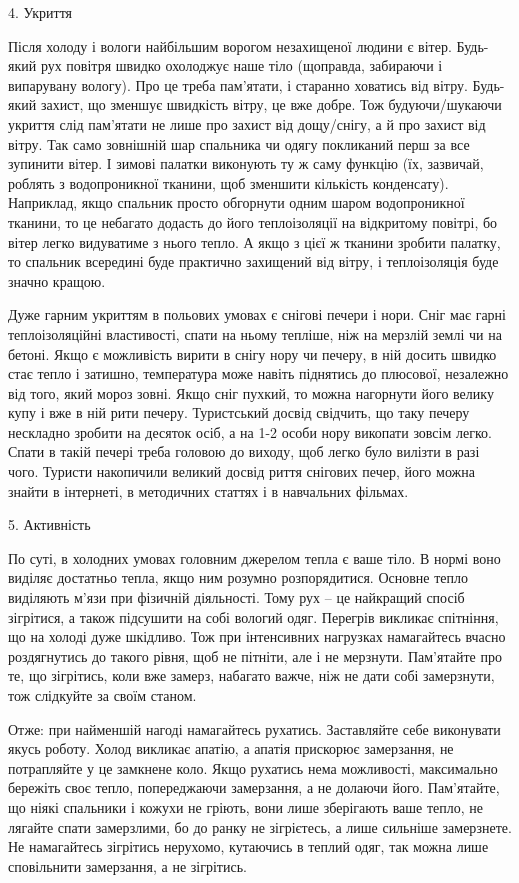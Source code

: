 4. Укриття

Після холоду і вологи найбільшим ворогом незахищеної людини є вітер. Будь-який
рух повітря швидко охолоджує наше тіло (щоправда, забираючи і випарувану
вологу). Про це треба пам’ятати, і старанно ховатись від вітру. Будь-який
захист, що зменшує швидкість вітру, це вже добре. Тож будуючи/шукаючи укриття
слід пам’ятати не лише про захист від дощу/снігу, а й про захист від вітру. Так
само зовнішній шар спальника чи одягу покликаний перш за все зупинити вітер. І
зимові палатки виконують ту ж саму функцію (їх, зазвичай, роблять з
водопроникної тканини, щоб зменшити кількість конденсату). Наприклад, якщо
спальник просто обгорнути одним шаром водопроникної тканини, то це небагато
додасть до його теплоізоляції на відкритому повітрі, бо вітер легко видуватиме
з нього тепло. А якщо з цієї ж тканини зробити палатку, то спальник всередині
буде практично захищений від вітру, і теплоізоляція буде значно кращою.

Дуже гарним укриттям в польових умовах є снігові печери і нори. Сніг має гарні
теплоізоляційні властивості, спати на ньому тепліше, ніж на мерзлій землі чи на
бетоні. Якщо є можливість вирити в снігу нору чи печеру, в ній досить швидко
стає тепло і затишно, температура може навіть піднятись до плюсової, незалежно
від того, який мороз зовні. Якщо сніг пухкий, то можна нагорнути його велику
купу і вже в ній рити печеру. Туристський досвід свідчить, що таку печеру
нескладно зробити на десяток осіб, а на 1-2 особи нору викопати зовсім легко.
Спати в такій печері треба головою до виходу, щоб легко було вилізти в разі
чого. Туристи накопичили великий досвід риття снігових печер, його можна знайти
в інтернеті, в методичних статтях і в навчальних фільмах.

5. Активність

По суті, в холодних умовах головним джерелом тепла є ваше тіло. В нормі воно
виділяє достатньо тепла, якщо ним розумно розпорядитися. Основне тепло
виділяють м’язи при фізичній діяльності. Тому рух – це найкращий спосіб
зігрітися, а також підсушити на собі вологий одяг. Перегрів викликає спітніння,
що на холоді дуже шкідливо. Тож при інтенсивних нагрузках намагайтесь вчасно
роздягнутись до такого рівня, щоб не пітніти, але і не мерзнути. Пам’ятайте про
те, що зігрітись, коли вже замерз, набагато важче, ніж не дати собі замерзнути,
тож слідкуйте за своїм станом.

Отже: при найменшій нагоді намагайтесь рухатись. Заставляйте себе виконувати
якусь роботу. Холод викликає апатію, а апатія прискорює замерзання, не
потрапляйте у це замкнене коло. Якщо рухатись нема можливості, максимально
бережіть своє тепло, попереджаючи замерзання, а не долаючи його. Пам’ятайте, що
ніякі спальники і кожухи не гріють, вони лише зберігають ваше тепло, не лягайте
спати замерзлими, бо до ранку не зігрієтесь, а лише сильніше замерзнете. Не
намагайтесь зігрітись нерухомо, кутаючись в теплий одяг, так можна лише
сповільнити замерзання, а не зігрітись.


